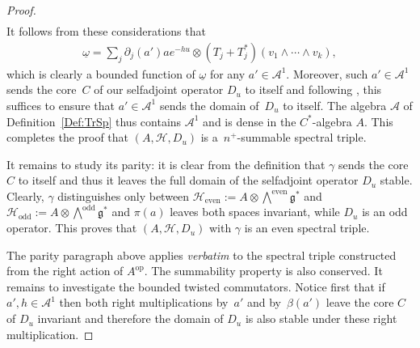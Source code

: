 \documentclass[pdftex]{sigma}
\newcommand{\Aa}{\mathcal{A}}
\newcommand{\Core}{C}
\newcommand{\Hh}{\mathscr{H}}
\newcommand{\LieG}{\mathfrak{g}}
\newcommand{\omegat}{\underline{\omega}}
\numberwithin{equation}{section}
\begin{document}
\begin{proof}
\begin{gather*}
\end{gather*}
It follows from these considerations that
\begin{gather*}
[D_u, a'] \omegat = \sum_j \partial_j(a') a e^{-h u} \otimes (T_j + T_j^*)( v_1 \wedge \cdots \wedge v_k),
\end{gather*}
which is clearly a bounded function of $\omegat$ for any $a' \in \Aa^1$. Moreover, such $a' \in \Aa^1$ sends the core~$\Core$ of our selfadjoint operator $D_u$ to itself and following \cite[Proposition~A.1, p.~293]{TrSpPiCr-Paterson}, this suf\/f\/ices to ensure that $a' \in \Aa^1$ sends the domain of~$D_u$ to itself. The algebra $\Aa$ of Def\/inition~\ref{Def:TrSp} thus contains $\Aa^1$ and is dense in the $C^*$-algebra $A$. This completes the proof that $(A, \Hh, D_u)$ is a~$n^+$-summable spectral triple.

It remains to study its parity: it is clear from the def\/inition that $\gamma$ sends the core $\Core$ to itself and thus it leaves the full domain of the selfadjoint operator $D_u$ stable. Clearly, $\gamma$ distinguishes only between $\Hh_\text{even} := A \otimes \bigwedge^\text{even} \LieG^*$ and $\Hh_\text{odd} := A \otimes \bigwedge^\text{odd} \LieG^*$ and $\pi(a)$ leaves both spaces invariant, while $D_u$ is an odd operator. This proves that $(A, \Hh, D_u)$ with $\gamma$ is an even spectral triple.

The parity paragraph above applies \textit{verbatim} to the spectral triple constructed from the right action of $A^\text{op}$. The summability property is also conserved. It remains to investigate the bounded twisted commutators. Notice f\/irst that if $a', h \in \Aa^1$ then both right multiplications by~$a'$ and by~$\beta(a')$ leave the core $\Core$ of $D_u$ invariant and therefore the domain of $D_u$ is also stable under these right multiplication.


\end{proof}
\end{document}
